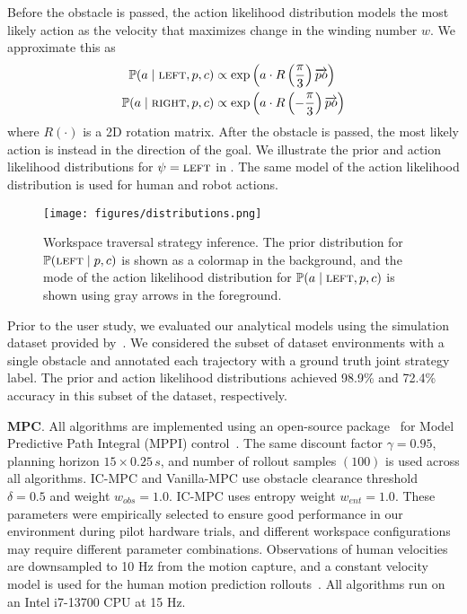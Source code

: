Before the obstacle is passed, the action likelihood distribution models the most likely action as the velocity that maximizes change in the winding number $w$. We approximate this as
\begin{equation}
\begin{split}
    \mathbb{P}(a \mid \textsc{left}, p, c) &\propto \exp\left(a \cdot R\left(\frac{\pi}{3}\right) \overrightarrow{po}\right) \\
    \mathbb{P}(a \mid \textsc{right}, p, c) &\propto \exp\left(a \cdot R\left(-\frac{\pi}{3}\right) \overrightarrow{po}\right)
\end{split}
\end{equation}
where $R(\cdot)$ is a 2D rotation matrix.
After the obstacle is passed, the most likely action is instead in the direction of the goal.
We illustrate the prior and action likelihood distributions for $\psi=\textsc{left}$ in . The same model of the action likelihood distribution is used for human and robot actions.

\begin{figure}
    \centering
    \texttt{[image: figures/distributions.png]}
    \caption{Workspace traversal strategy inference. The prior distribution for $\mathbb{P}(\textsc{left} \mid p, c)$ is shown as a colormap in the background, and the mode of the action likelihood distribution for $\mathbb{P}(a \mid \textsc{left}, p, c)$ is shown using gray arrows in the foreground.}
    \label{fig:prior-distribution}
\end{figure}

Prior to the user study, we evaluated our analytical models using the simulation dataset provided by~\citet{ng2023takes}.
We considered the subset of dataset environments with a single obstacle and annotated each trajectory with a ground truth joint strategy label.
The prior and action likelihood distributions achieved 98.9\% and 72.4\% accuracy in this subset of the dataset, respectively.

\textbf{MPC}.
All algorithms are implemented using an open-source package~\citep{arm-mppi} for Model Predictive Path Integral (MPPI) control~\citep{williams2017mppi}.
The same discount factor $\gamma = 0.95$, planning horizon $15 \times 0.25\,s$, and number of rollout samples $(100)$ is used across all algorithms. IC-MPC and Vanilla-MPC use obstacle clearance threshold $\delta = 0.5$ and weight $w_{obs} = 1.0$. IC-MPC uses entropy weight $w_{ent} = 1.0$.
These parameters were empirically selected to ensure good performance in our environment during pilot hardware trials, and different workspace configurations may require different parameter combinations.
Observations of human velocities are downsampled to 10 Hz from the motion capture, and a constant velocity model is used for the human motion prediction rollouts~\citep{scholler2020constant}.
All algorithms run on an Intel i7-13700 CPU at 15 Hz.

